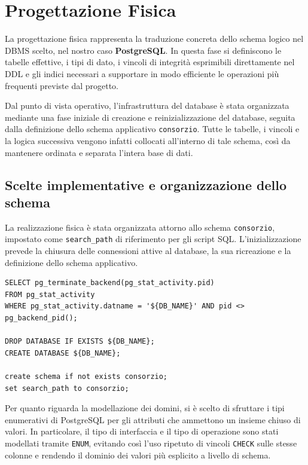 
\section{Progettazione Fisica}
La progettazione fisica rappresenta la traduzione concreta dello schema logico nel DBMS scelto, nel nostro caso \textbf{PostgreSQL}. In questa fase si definiscono le tabelle effettive, i tipi di dato, i vincoli di integrità esprimibili direttamente nel DDL e gli indici necessari a supportare in modo efficiente le operazioni più frequenti previste dal progetto.

Dal punto di vista operativo, l'infrastruttura del database è stata organizzata mediante una fase iniziale di creazione e reinizializzazione del database, seguita dalla definizione dello schema applicativo \texttt{consorzio}. Tutte le tabelle, i vincoli e la logica successiva vengono infatti collocati all'interno di tale schema, così da mantenere ordinata e separata l'intera base di dati.

\subsection{Scelte implementative e organizzazione dello schema}
La realizzazione fisica è stata organizzata attorno allo schema \texttt{consorzio}, impostato come \texttt{search\_path} di riferimento per gli script SQL. L'inizializzazione prevede la chiusura delle connessioni attive al database, la sua ricreazione e la definizione dello schema applicativo.

\begin{lstlisting}[caption={Inizializzazione del database e dello schema}]
SELECT pg_terminate_backend(pg_stat_activity.pid)
FROM pg_stat_activity
WHERE pg_stat_activity.datname = '${DB_NAME}' AND pid <> pg_backend_pid();

DROP DATABASE IF EXISTS ${DB_NAME};
CREATE DATABASE ${DB_NAME};

create schema if not exists consorzio;
set search_path to consorzio;
\end{lstlisting}

Per quanto riguarda la modellazione dei domini, si è scelto di sfruttare i tipi enumerativi di PostgreSQL per gli attributi che ammettono un insieme chiuso di valori. In particolare, il tipo di interfaccia e il tipo di operazione sono stati modellati tramite \texttt{ENUM}, evitando così l'uso ripetuto di vincoli \texttt{CHECK} sulle stesse colonne e rendendo il dominio dei valori più esplicito a livello di schema.

